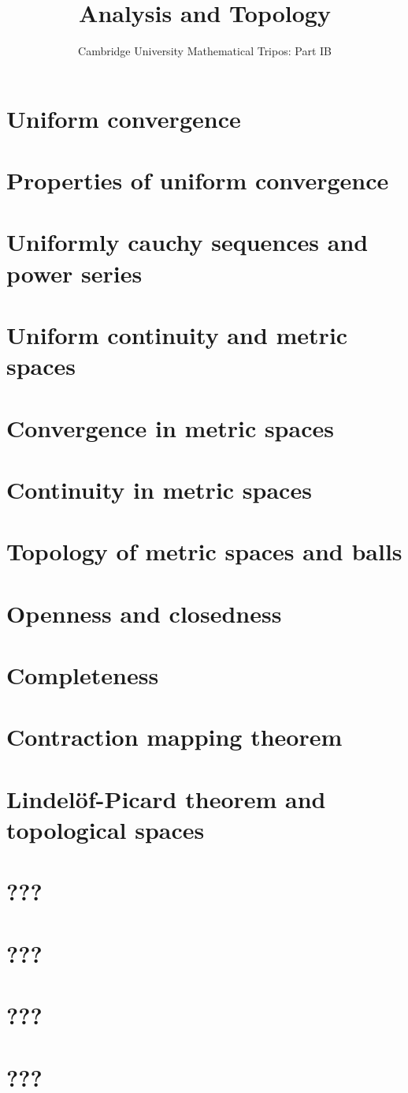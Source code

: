 \documentclass{article}
\title{Analysis and Topology}
\author{Cambridge University Mathematical Tripos: Part IB}
\begin{document}
\maketitle

\tableofcontentsnewpage{}

\section{Uniform convergence}

\section{Properties of uniform convergence}

\section{Uniformly cauchy sequences and power series}

\section{Uniform continuity and metric spaces}

\section{Convergence in metric spaces}

\section{Continuity in metric spaces}

\section{Topology of metric spaces and balls}

\section{Openness and closedness}

\section{Completeness}

\section{Contraction mapping theorem}

\section{Lindel\"of-Picard theorem and topological spaces}

\section{???}

\section{???}

\section{???}

\section{???}

\end{document}
